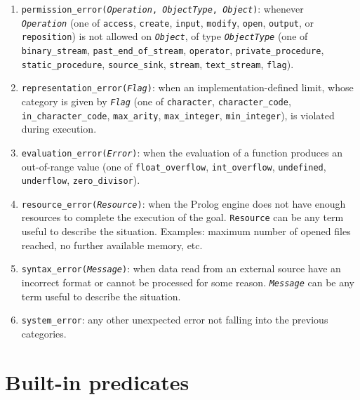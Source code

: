 \begin{enumerate}
  \item \texttt{permission\_error(\textit{Operation}, \textit{ObjectType}, \textit{Object})}: whenever\\
       \texttt{\textit{Operation}} (one of \texttt{access}, \texttt{create}, \texttt{input}, \texttt{modify}, \texttt{open}, \texttt{output}, or \texttt{reposition}) is not allowed on \texttt{\textit{Object}}, of type \texttt{\textit{ObjectType}} (one of  \texttt{binary\_stream}, \texttt{past\_end\_of\_stream}, \texttt{operator}, \texttt{private\_procedure}, \texttt{static\_procedure}, \texttt{source\_sink}, \texttt{stream}, \texttt{text\_stream}, \texttt{flag}).

  \item \texttt{representation\_error(\textit{Flag})}: when an implementation-defined limit, whose category is given by \texttt{\textit{Flag}} (one of
      \texttt{character}, \texttt{character\_code}, \texttt{in\_character\_code}, \texttt{max\_arity}, \texttt{max\_integer}, \texttt{min\_integer}), is violated during execution.

  \item \texttt{evaluation\_error(\textit{Error})}: when the evaluation of a function produces an out-of-range value (one of \texttt{float\_overflow}, \texttt{int\_overflow}, \texttt{undefined}, \texttt{underflow}, \texttt{zero\_divisor}).

  \item \texttt{resource\_error(\textit{Resource})}: when the Prolog engine does not have enough resources to complete the execution of the goal. \texttt{Resource} can be any term useful to describe the situation. Examples: maximum number of opened files reached, no further available memory, etc.

  \item \texttt{syntax\_error(\textit{Message})}: when data read from an external source have an incorrect format or cannot be processed for some reason. \texttt{\textit{Message}} can be any term useful to describe the situation.

  \item \texttt{system\_error}: any other unexpected error not falling into the previous categories.
\end{enumerate}


\section{Built-in predicates}
\label{sec:builtins}

